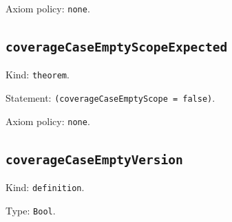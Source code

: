 \documentclass[11pt]{article}
\begin{document}
\noindent Axiom policy: \texttt{none}.\par
\subsection*{\texttt{coverageCaseEmptyScopeExpected}}
\noindent Kind: \texttt{theorem}.\par
\noindent Statement: \texttt{(coverageCaseEmptyScope = false)}.\par
\noindent Axiom policy: \texttt{none}.\par
\subsection*{\texttt{coverageCaseEmptyVersion}}
\noindent Kind: \texttt{definition}.\par
\noindent Type: \texttt{Bool}.\par
\end{document}
